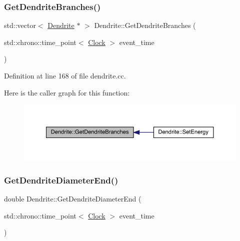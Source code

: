 \subsubsection{\texorpdfstring{Get\+Dendrite\+Branches()}{GetDendriteBranches()}}
{\footnotesize\ttfamily std\+::vector$<$ \hyperlink{class_dendrite}{Dendrite} $\ast$ $>$ Dendrite\+::\+Get\+Dendrite\+Branches (\begin{DoxyParamCaption}\item[{std\+::chrono\+::time\+\_\+point$<$ \hyperlink{universe_8h_a0ef8d951d1ca5ab3cfaf7ab4c7a6fd80}{Clock} $>$}]{event\+\_\+time }\end{DoxyParamCaption})}



Definition at line 168 of file dendrite.\+cc.

Here is the caller graph for this function\+:
\nopagebreak
\begin{figure}[H]
\begin{center}
\leavevmode
\includegraphics[width=350pt]{class_dendrite_a00b524d47e3662df712ea060ebadca77_icgraph}
\end{center}
\end{figure}
\mbox{\label{class_dendrite_a2c46d2612d09964a473e1de99c17fa13}} 
\subsubsection{\texorpdfstring{Get\+Dendrite\+Diameter\+End()}{GetDendriteDiameterEnd()}}
{\footnotesize\ttfamily double Dendrite\+::\+Get\+Dendrite\+Diameter\+End (\begin{DoxyParamCaption}\item[{std\+::chrono\+::time\+\_\+point$<$ \hyperlink{universe_8h_a0ef8d951d1ca5ab3cfaf7ab4c7a6fd80}{Clock} $>$}]{event\+\_\+time }\end{DoxyParamCaption})\hspace{0.3cm}{\ttfamily [inline]}}




